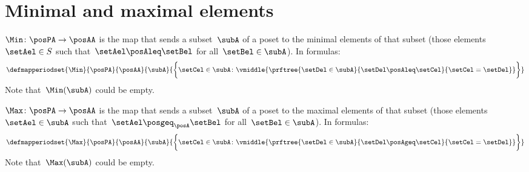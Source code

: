 \section{Minimal and maximal elements}

\begin{ctdefinition}
    \label{def:Min}
    $\Min \colon \posPA \to \posAA$ is the map that sends a subset~$\subA$ of a poset to the minimal elements of that subset (those elements~$\setAel \in S$ such that~$\setAel \posAleq \setBel$ for all~$\setBel \in \subA$).
    In formulas:
    \begin{equation*}
        \defmapperiodset{\Min}{\posPA}{\posAA}{\subA}{\bigg\{
            \setCel\in \subA\colon
            \vmiddle{
                \prftree{
                    \setDel\in \subA
                }{
                    \setDel\posAleq \setCel
                }{
                    \setCel=\setDel
                }
            }
            \bigg\}}
    \end{equation*}
    Note that~$\Min(\subA)$ could be empty.
\end{ctdefinition}

\begin{ctdefinition}
    \label{def:Max}
    $\Max \colon \posPA \to \posAA$ is the map that sends a subset~$\subA$ of a poset to the maximal elements of that subset (those elements~$\setAel \in \subA$ such that~$\setAel \posgeq_\posA \setBel$ for all~$\setBel \in \subA$).
    In formulas:
    \begin{equation*}
        \defmapperiodset{
            \Max
        }{
            \posPA
        }{
            \posAA
        }{
            \subA
        }{
            \bigg\{
            \setCel\in \subA\colon
            \vmiddle{
                \prftree{
                    \setDel\in \subA
                }{
                    \setDel\posAgeq \setCel
                }{
                    \setCel=\setDel
                }
            }
            \bigg\}
        }
    \end{equation*}
    Note that~$\Max(\subA)$ could be empty.
\end{ctdefinition}

